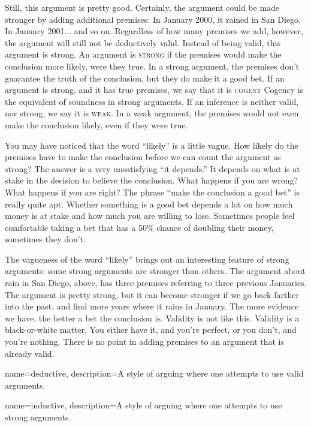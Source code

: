 Still, this argument is pretty good. Certainly, the argument could be made stronger by adding additional premises: In January 2000, it rained in San Diego. In January 2001$\ldots$ and so on. Regardless of how many premises we add, however, the argument will still not be deductively valid. Instead of being valid, this argument is strong. An argument is \textsc{\gls{strong}} \label{def:strong} if the premises would make the conclusion more likely, were they true. In a strong argument, the premises don't guarantee the truth of the conclusion, but they do make it a good bet. If an argument is strong, and it has true premises, we say that it is \textsc{\gls{cogent}} \label{def:cogent} Cogency is the equivalent of soundness in strong arguments. If an inference is neither valid, nor strong, we say it is \textsc{\gls{weak}}. \label{def:weak}In a weak argument, the premises would not even make the conclusion likely, even if they were true.

You may have noticed that the word ``likely'' is a little vague. How likely do the premises have to make the conclusion before we can count the argument as strong? The answer is a very unsatisfying ``it depends.'' It depends on what is at stake in the decision to believe the conclusion. What happens if you are wrong? What happens if you are right? The phrase ``make the conclusion a good bet'' is really quite apt. Whether something is a good bet depends a lot on how much money is at stake and how much you are willing to lose. Sometimes people feel comfortable taking a bet that has a 50\% chance of doubling their money, sometimes they don't. 

The vagueness of the word ``likely'' brings out an interesting feature of strong arguments: some strong arguments are stronger than others. The argument about rain in San Diego, above, has three premises referring to three previous Januaries. The argument is pretty strong, but it can become stronger if we go back farther into the past, and find more years where it rains in January. The more evidence we have, the better a bet the conclusion is. Validity is not like this. Validity is a black-or-white matter. You either have it, and you're perfect, or you don't, and you're nothing. There is no point in adding premises to an argument that is already valid. 

{
name=deductive,
description={A style of arguing where one attempts to use valid arguments.}
}

{
name=inductive,
description={A style of arguing where one attempts to use strong arguments.}
}

